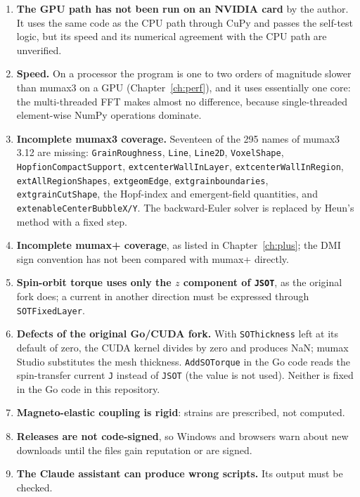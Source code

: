 \documentclass[11pt,a4paper,oneside]{book}
\newcommand{\code}[1]{\texttt{#1}}
\renewcommand{\_}{\textunderscore\allowbreak}
\begin{document}
\begin{enumerate}
\item \textbf{The GPU path has not been run on an NVIDIA card} by the author. It uses the same code as the CPU
path through CuPy and passes the self-test logic, but its speed and its numerical agreement with the CPU path are
unverified.
\item \textbf{Speed.} On a processor the program is one to two orders of magnitude slower than mumax3 on a GPU
(Chapter~\ref{ch:perf}), and it uses essentially one core: the multi-threaded FFT makes almost no difference,
because single-threaded element-wise NumPy operations dominate.
\item \textbf{Incomplete mumax3 coverage.} Seventeen of the 295 names of mumax3 3.12 are missing:
\code{GrainRoughness}, \code{Line}, \code{Line2D}, \code{VoxelShape}, \code{HopfionCompactSupport},
\code{ext\_centerWallInLayer}, \code{ext\_centerWallInRegion}, \code{ext\_AllRegionShapes},
\code{ext\_geomEdge}, \code{ext\_grainboundaries}, \code{ext\_grainCutShape}, the Hopf-index and emergent-field
quantities, and \code{ext\_enableCenterBubbleX/Y}. The backward-Euler solver is replaced by Heun's method with a
fixed step.
\item \textbf{Incomplete mumax+ coverage}, as listed in Chapter~\ref{ch:plus}; the DMI sign convention has not
been compared with mumax+ directly.
\item \textbf{Spin-orbit torque uses only the $z$ component of \code{JSOT}}, as the original fork does; a current
in another direction must be expressed through \code{SOTFixedLayer}.
\item \textbf{Defects of the original Go/CUDA fork.} With \code{SOThickness} left at its default of zero, the
CUDA kernel divides by zero and produces NaN; mumax Studio substitutes the mesh thickness. \code{AddSOTorque} in the
Go code reads the spin-transfer current \code{J} instead of \code{JSOT} (the value is not used). Neither is fixed in
the Go code in this repository.
\item \textbf{Magneto-elastic coupling is rigid}: strains are prescribed, not computed.
\item \textbf{Releases are not code-signed}, so Windows and browsers warn about new downloads until the files
gain reputation or are signed.
\item \textbf{The Claude assistant can produce wrong scripts.} Its output must be checked.
\end{enumerate}

\appendix
\end{document}
